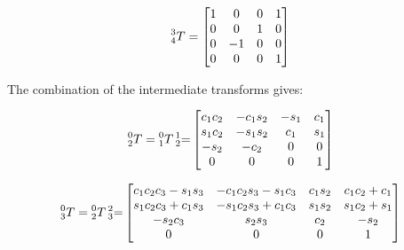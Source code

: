 \documentclass{exam}
\begin{document}
\begin{questions}
\begin{parts}
\begin{equation}
  \prescript{3}{4}T = \begin{bmatrix}
    1 & 0  & 0 & 1 \\
    0 & 0  & 1 & 0 \\
    0 & -1 & 0 & 0 \\
    0 & 0  & 0 & 1 \\
                     \end{bmatrix}
\end{equation}

The combination of the intermediate transforms gives:

\begin{equation}
  \prescript{0}{2}T = \prescript{0}{1}T\prescript{1}{2} = \begin{bmatrix}
    c_{1}c_{2} & -c_{1}s_{2} & -s_{1} & c_{1} \\
    s_{1}c_{2} & -s_{1}s_{2} & c_{1}  & s_{1} \\
    -s_{2}     & -c_{2}      & 0      & 0     \\
    0          & 0           & 0      & 1     \\
                                                          \end{bmatrix}
\end{equation}

\begin{equation}
  \prescript{0}{3}T = \prescript{0}{2}T\prescript{2}{3} = \begin{bmatrix}
    c_{1}c_{2}c_{3}-s_{1}s_{3} & -c_{1}c_{2}s_{3}-s_{1}c_{3} & c_{1}s_{2} & c_{1}c_{2}+c_{1} \\
    s_{1}c_{2}c_{3}+c_{1}s_{3} & -s_{1}c_{2}s_{3}+c_{1}c_{3} & s_{1}s_{2} & s_{1}c_{2}+s_{1} \\
    -s_{2}c_{3}                & s_{2}s_{3}                  & c_{2}      & -s_{2}           \\
    0                          & 0                           & 0          & 1                \\
                                                          \end{bmatrix}
\end{equation}


\end{parts}
\end{questions}
\end{document}
